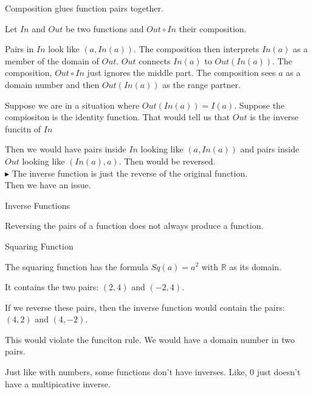 \documentclass{ximera}
\begin{document}
Composition glues function pairs together.

Let $In$ and $Out$ be two functions and $Out \circ In$ their composition.


Pairs in $In$ look like $(a, In(a))$.   The composition then interprets $In(a)$ as a member of the domain of $Out$.  $Out$ connects $In(a)$ to $Out(In(a))$.   The composition, $Out \circ In$ just ignores the middle part.  The composition sees $a$ as a domain number and then $Out(In(a))$ as the range partner.


Suppose we are in a situation where $Out(In(a)) = I(a)$.  Suppose the compiositon is the identity function.  That would tell us that $Out$ is the inverse funcitn of $In$

Then we would have pairs inside $In$ looking like $(a, In(a))$ and pairs inside $Out$ looking like $(In(a), a)$.  Then would be reversed. \\


$\blacktriangleright$ The inverse function is just the reverse of the original function. \\


Then we have an issue.


\begin{warning}Inverse Functions

Reversing the pairs of a function does not always produce a function.


\end{warning}




\begin{example} Squaring Function


The squaring function has the formula $Sq(a) =a^2$ with \textbf{$\mathbb{R}$} as its domain.

It contains the two pairs: $(2, 4)$ and $(-2, 4)$.



If we reverse these pairs, then the inverse function would contain the pairs: $(4, 2)$ and $(4,-2)$.

This would violate the funciton rule.  We would have a domain number in two pairs.

\end{example}



Just like with numbers, some functions don't have inverses.  Like, $0$ just doesn't have a multipicative inverse.
\end{document}
